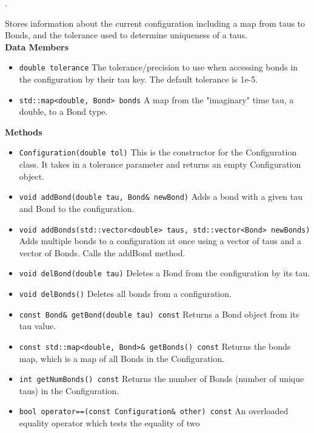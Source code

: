 \begin{description}
\begin{itemize}
        .
    \end{itemize}
  \item[\texttt{\textbf{Configuration}}]
    Stores information about the current configuration including a map from taus 
    to Bonds, and the tolerance used to determine uniqueness of a taus. \\
    \textbf{Data Members}
    \begin{itemize}
      \item \texttt{double tolerance}
        The tolerance/precision to use when accessing bonds in the 
        configuration by their tau key. 
        The default tolerance is 1e-5. 
      \item \texttt{std::map<double, Bond> bonds}
        A map from the "imaginary" time tau, a double, to a Bond type. 
    \end{itemize}
    \textbf{Methods}
    \begin{itemize}
      \item \texttt{Configuration(double tol)}
        This is the constructor for the Configuration class.
        It takes in a tolerance parameter and returns an empty Configuration 
        object.
      \item \texttt{void addBond(double tau, Bond\& newBond)}
        Adds a bond with a given tau and Bond to the configuration.
      \item \texttt{void addBonds(std::vector<double> taus, std::vector<Bond> newBonds)}
        Adds multiple bonds to a configuration at once using a vector of taus
        and a vector of Bonds.
        Calls the addBond method.
      \item \texttt{void delBond(double tau)}
        Deletes a Bond from the configuration by its tau. 
      \item \texttt{void delBonds()}
        Deletes all bonds from a configuration. 
      \item \texttt{const Bond\& getBond(double tau) const}
        Returns a Bond object from its tau value. 
      \item \texttt{const std::map<double, Bond>\& getBonds() const}
        Returns the bonds map, which is a map of all Bonds in the Configuration.
      \item \texttt{int getNumBonds() const}
        Returns the number of Bonds (number of unique taus) in the Configuration. 
      \item \texttt{bool operator==(const Configuration\& other) const}
        An overloaded equality operator which tests the equality of two 

\end{itemize}
\end{description}
